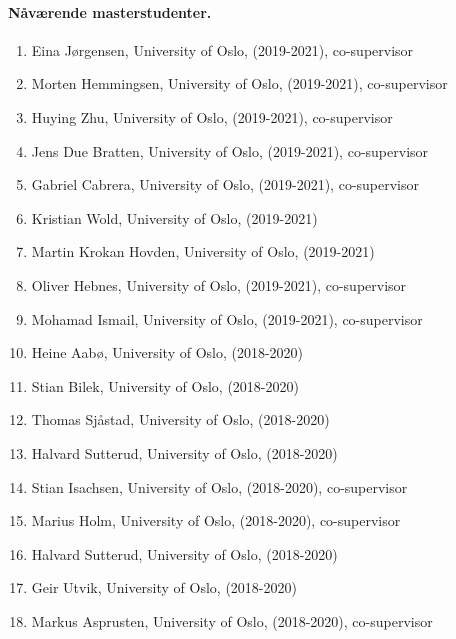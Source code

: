 \documentclass[aps,floatfix,preprint]{revtex4-1}
\begin{document}
\paragraph*{Nåværende masterstudenter.}
\begin{enumerate}
\item Eina Jørgensen, University of Oslo, (2019-2021), co-supervisor

\item Morten Hemmingsen, University of Oslo, (2019-2021), co-supervisor

\item Huying Zhu, University of Oslo, (2019-2021), co-supervisor

\item Jens Due Bratten, University of Oslo, (2019-2021), co-supervisor

\item Gabriel Cabrera, University of Oslo, (2019-2021), co-supervisor

\item Kristian Wold, University of Oslo, (2019-2021)

\item Martin Krokan Hovden, University of Oslo, (2019-2021)

\item Oliver Hebnes, University of Oslo, (2019-2021), co-supervisor

\item Mohamad Ismail, University of Oslo, (2019-2021), co-supervisor

\item Heine Aabø, University of Oslo, (2018-2020)

\item Stian Bilek, University of Oslo, (2018-2020)

\item Thomas Sjåstad, University of Oslo, (2018-2020)

\item Halvard Sutterud, University of Oslo, (2018-2020)

\item Stian Isachsen, University of Oslo, (2018-2020), co-supervisor

\item Marius Holm, University of Oslo, (2018-2020), co-supervisor

\item Halvard Sutterud, University of Oslo, (2018-2020)

\item Geir Utvik, University of Oslo, (2018-2020)

\item Markus Asprusten, University of Oslo, (2018-2020), co-supervisor
\end{enumerate}
\end{document}
